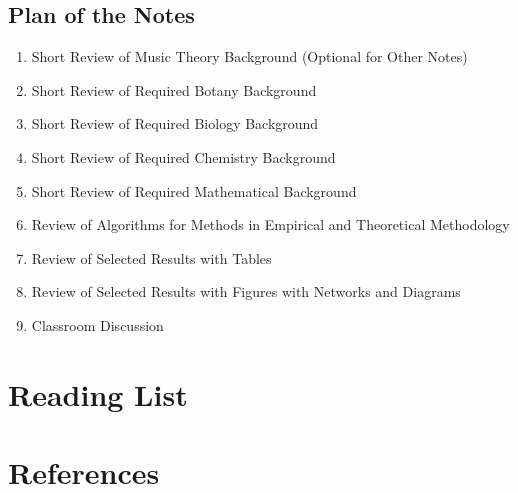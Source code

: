 \documentclass[preprint, 9pt,times]{elsarticle}
\theoremstyle{definition}
\begin{document}
\vspace{4pt}

\subsection{Plan of the Notes}

\begin{enumerate}
\item Short Review of Music Theory Background (Optional for Other Notes)
\item Short Review of Required Botany Background
\item Short Review of Required Biology Background
\item Short Review of Required Chemistry Background
\item Short Review of Required Mathematical Background
\item Review of Algorithms for Methods in Empirical and Theoretical Methodology
\item Review of Selected Results with Tables
\item Review of Selected Results with Figures with Networks and Diagrams
\item Classroom Discussion
\end{enumerate}



\section{Reading List}

\section{References}
\end{document}
